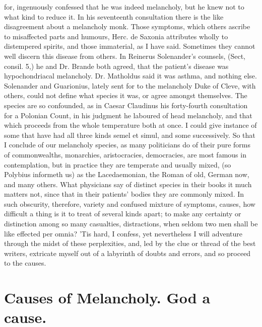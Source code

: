 {for, ingenuously confessed that he was indeed melancholy, but he knew
not to what kind to reduce it. In his seventeenth consultation there is
the like disagreement about a melancholy monk. Those symptoms, which
others ascribe to misaffected parts and humours, Herc. de Saxonia
attributes wholly to distempered spirits, and those immaterial, as I
have said. Sometimes they cannot well discern this disease from others.
In Reinerus Solenander's counsels, (Sect, consil. 5,) he and Dr. Brande
both agreed, that the patient's disease was hypochondriacal melancholy.
Dr. Matholdus said it was asthma, and nothing else. Solenander
and Guarionius, lately sent for to the melancholy Duke of Cleve, with
others, could not define what species it was, or agree amongst
themselves. The species are so confounded, as in Caesar Claudinus his
forty-fourth consultation for a Polonian Count, in his judgment
he laboured of head melancholy, and that which proceeds from the
whole temperature both at once. I could give instance of some that have
had all three kinds semel et simul, and some successively. So that I
conclude of our melancholy species, as many politicians do of
their pure forms of commonwealths, monarchies, aristocracies,
democracies, are most famous in contemplation, but in practice they are
temperate and usually mixed, (so Polybius informeth us) as the
Lacedaemonian, the Roman of old, German now, and many others. What
physicians say of distinct species in their books it much matters not,
since that in their patients' bodies they are commonly mixed. In such
obscurity, therefore, variety and confused mixture of symptoms, causes,
how difficult a thing is it to treat of several kinds apart; to make
any certainty or distinction among so many casualties, distractions,
when seldom two men shall be like effected per omnia? 'Tis hard, I
confess, yet nevertheless I will adventure through the midst of these
perplexities, and, led by the clue or thread of the best writers,
extricate myself out of a labyrinth of doubts and errors, and so
proceed to the causes.



\section{Causes of Melancholy. God a cause.}

}
